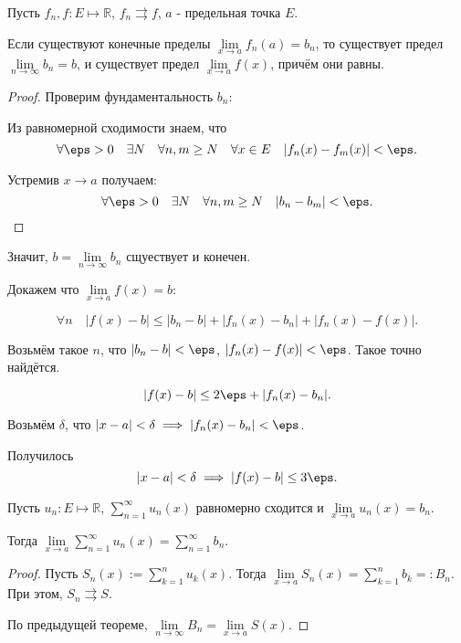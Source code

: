 \begin{theorem} \thmslashn

    Пусть $f_{n}, f : E \mapsto \mathbb{R}$, $f_{n} \rightrightarrows f$, $a$ - предельная точка $E$.

    Если существуют конечные пределы $\lim\limits_{x \to a} f_{n}(a) = b_{n}$, то существует предел $\lim\limits_{n \to \infty} b_{n} = b$, и существует предел $\lim\limits_{x \to a} f(x)$, причём они равны.
    \begin{proof} \thmslashn
    
        Проверим фундаментальность $b_{n}$: 

        Из равномерной сходимости знаем, что
        \[ \forall{\eps > 0}\quad \exists{N}\quad \forall{n, m \ge N}\quad \forall{x\in E}\quad |f_{n}(x) - f_{m}(x)| < \eps .\]

        Устремив $x \to a$ получаем:
        \[ \forall{\eps > 0}\quad \exists{N}\quad \forall{n, m \ge N}\quad |b_{n} - b_{m}| < \eps .\] 
    \end{proof}

    Значит, $b = \lim\limits_{n \to \infty} b_{n}$ сщуествует и конечен.

    Докажем что $\lim\limits_{x \to a} f(x) = b$:

    \[ \forall{n}\quad |f(x) - b| \le |b_{n} - b| + |f_{n}(x) - b_{n}| + |f_{n}(x) - f(x)| .\] 

    Возьмём такое $n$, что $|b_{n} - b| < \eps$, $|f_{n}(x) - f(x)| < \eps$. Такое точно найдётся.

    \[ |f(x) - b| \le 2\eps + |f_{n}(x) - b_{n}| .\]
    
    Возьмём $\delta$, что $|x-a|< \delta \implies |f_{n}(x) - b_{n}| < \eps$.

    Получилось
    \[ |x-a| < \delta \implies |f(x) - b| \le 3\eps .\] 
\end{theorem}
\begin{theorem} \thmslashn

    Пусть $u_{n} : E \mapsto \mathbb{R}$, $\sum\limits_{n=1}^{\infty} u_{n}(x)$ равномерно сходится и $\lim\limits_{x \to a} u_{n}(x) = b_{n}$.

    Тогда $\lim\limits_{x \to a} \sum\limits_{n=1}^{\infty} u_{n}(x) = \sum\limits_{n=1}^{\infty} b_{n}$.
    \begin{proof} \thmslashn
    
        Пусть $S_{n}(x) := \sum\limits_{k=1}^{n} u_{k}(x)$. Тогда $\lim\limits_{x \to a} S_{n}(x) = \sum\limits_{k=1}^{n} b_{k} =: B_{n}$. При этом, $S_{n} \rightrightarrows S$.

        По предыдущей теореме, $\lim\limits_{n \to \infty} B_{n} = \lim\limits_{x \to a} S(x)$.
    \end{proof}
\end{theorem}
